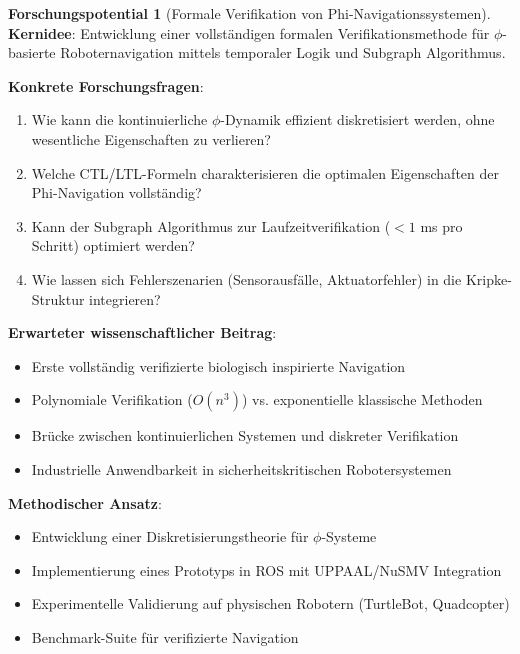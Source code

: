 ﻿\documentclass[a4paper,12pt]{article}
\theoremstyle{definition}
\newtheorem{potential}{Forschungspotential}[section]
\begin{document}
\begin{potential}[Formale Verifikation von Phi-Navigationssystemen]
\textbf{Kernidee}: Entwicklung einer vollständigen formalen Verifikationsmethode für $\phi$-basierte Roboternavigation mittels temporaler Logik und Subgraph Algorithmus.

\textbf{Konkrete Forschungsfragen}:
\begin{enumerate}
	\item Wie kann die kontinuierliche $\phi$-Dynamik effizient diskretisiert werden, ohne wesentliche Eigenschaften zu verlieren?
	\item Welche CTL/LTL-Formeln charakterisieren die optimalen Eigenschaften der Phi-Navigation vollständig?
	\item Kann der Subgraph Algorithmus zur Laufzeitverifikation ($< 1$ ms pro Schritt) optimiert werden?
	\item Wie lassen sich Fehlerszenarien (Sensorausfälle, Aktuatorfehler) in die Kripke-Struk\-tur integrieren?
\end{enumerate}

\textbf{Erwarteter wissenschaftlicher Beitrag}:
\begin{itemize}
	\item Erste vollständig verifizierte biologisch inspirierte Navigation
	\item Polynomiale Verifikation ($O(n^3)$) vs. exponentielle klassische Methoden
	\item Brücke zwischen kontinuierlichen Systemen und diskreter Verifikation
	\item Industrielle Anwendbarkeit in sicherheitskritischen Robotersystemen
\end{itemize}

\textbf{Methodischer Ansatz}:
\begin{itemize}
	\item Entwicklung einer Diskretisierungstheorie für $\phi$-Systeme
	\item Implementierung eines Prototyps in ROS mit UPPAAL/NuSMV Integration
	\item Experimentelle Validierung auf physischen Robotern (TurtleBot, Quadcopter)
	\item Benchmark-Suite für verifizierte Navigation
\end{itemize}
\end{potential}
\end{document}
